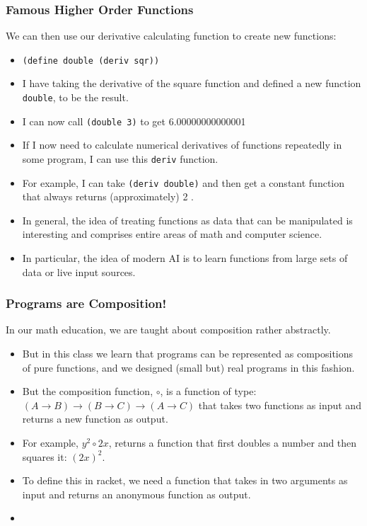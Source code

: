 \documentclass{beamer}
\begin{document}
\begin{frame}
  \frametitle{Famous Higher Order Functions}
  We can then use our derivative calculating function to
  create new functions:
  \begin{itemize}
  \item<2-> \texttt{(define double (deriv sqr))}
  \item<3-> I have taking the derivative of the square function and defined
    a new function \texttt{double}, to be the result.
  \item<4-> I can now call \texttt{(double 3)} to get
    6.00000000000001
  \item<5-> If I now need to calculate numerical derivatives of functions
    repeatedly in some program, I can use this \texttt{deriv}
    function.
  \item<6-> For example, I can take \texttt{(deriv double)} and
    then get a constant function that always returns (approximately) 2 .
  \item<7-> In general, the idea of treating functions as data that can be
    manipulated is interesting and comprises entire areas of math and computer
    science.
  \item<8-> In particular, the idea of modern AI is to learn functions
    from large sets of data or live input sources.
  \end{itemize}
\end{frame}


\begin{frame}
  \frametitle{Programs are Composition!}
  In our math education, we are taught about composition rather abstractly.
  \begin{itemize}
  \item<2-> But in this class we learn that programs can be represented as compositions
    of pure functions, and we designed (small but) real programs in this fashion.
  \item<3-> But the composition function, $\circ$, is a function of type:
    $(A \rightarrow B) \rightarrow (B \rightarrow C) \rightarrow (A \rightarrow C)$ that takes two functions as input and
    returns a new function as output.
  \item<5-> For example, $y^2 \circ 2x$, returns a function that first doubles
    a number and then squares it: $(2x)^2$.
  \item<6-> To define this in racket, we need a function that takes in two
    arguments as input and returns an anonymous function as output.
  \item<7-> \compose
  \end{itemize}
\end{frame}
\end{document}

